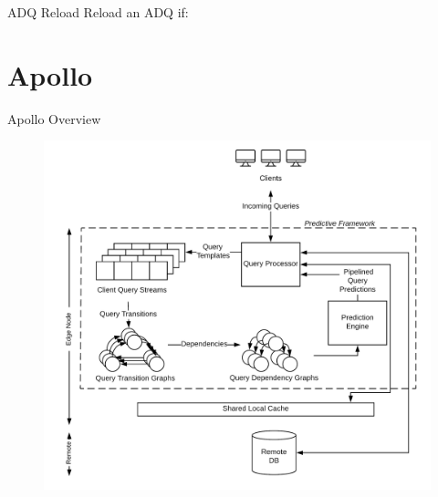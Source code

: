 \documentclass[10pt]{beamer}
\begin{document}
\begin{frame}[fragile]{ADQ Reload}
Reload an ADQ if:
\begin{itemize}
\end{itemize}
\end{frame}

\section{Apollo}

\begin{frame}[fragile]{Apollo Overview}
    \begin{figure}
        \hspace*{-1cm}
        \includegraphics[scale=0.13]{apollo_overview}
    \end{figure}
\end{frame}
\end{document}

